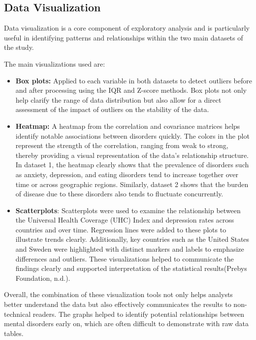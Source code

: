 \subsection {Data Visualization}
    
     Data visualization is a core component of exploratory analysis and is particularly useful in identifying patterns and relationships within the two main datasets of the study.
    
    The  main visualizations used are:

    \begin{itemize}
        \item \textbf{Box plots:} Applied to each variable in both datasets to detect outliers before and after processing using the IQR and Z-score methods. Box plots not only help clarify the range of data distribution but also allow for a direct assessment of the impact of outliers on the stability of the data.
    
        \item \textbf{Heatmap:} A heatmap from the correlation and covariance matrices helps identify notable associations between disorders quickly. The colors in the plot represent the strength of the correlation, ranging from weak to strong, thereby providing a visual representation of the data's relationship structure. In dataset 1, the heatmap clearly shows that the prevalence of disorders such as anxiety, depression, and eating disorders tend to increase together over time or across geographic regions. Similarly, dataset 2 shows that the burden of disease due to these disorders also tends to fluctuate concurrently.

\item \textbf{Scatterplots}: Scatterplots were used to examine the relationship between the Universal Health Coverage (UHC) Index and depression rates across countries and over time. Regression lines were added to these plots to illustrate trends clearly. Additionally, key countries such as the United States and Sweden were highlighted with distinct markers and labels to emphasize differences and outliers. These visualizations helped to communicate the findings clearly and supported interpretation of the statistical results(Prebys Foundation, n.d.).

     \end{itemize}
     
    Overall, the combination of these visualization tools not only helps analysts better understand the data but also effectively communicates the results to non-technical readers. The graphs helped to identify potential relationships between mental disorders early on, which are often difficult to demonstrate with raw data tables.

